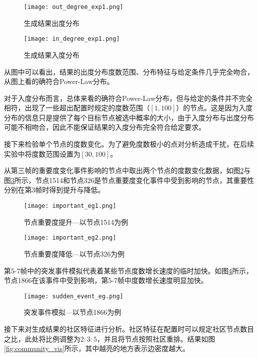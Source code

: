 \begin{figure}
\begin{minipage}{0.48\textwidth}
  \centering
  \texttt{[image: out\_degree\_exp1.png]}
  \caption{生成结果出度分布}
  \label{fig:parallel1}
\end{minipage}\hfill
\begin{minipage}{0.48\textwidth}
  \centering
  \texttt{[image: in\_degree\_exp1.png]}
  \caption{生成结果入度分布}
  \label{fig:parallel2}
\end{minipage}
\end{figure}

从图中可以看出，结果的出度分布度数范围、分布特征与给定条件几乎完全吻合，从图上看的确符合Power-Law分布。

对于入度分布而言，总体来看的确符合Power-Law分布，但与给定的条件并不完全相符，出现了一些超出配置时规定的度数范围（$[1, 100]$）的节点。这是因为入度分布的信息只是提供了每个目标节点被选中概率的大小，由于入度分布与出度分布可能不相吻合，因此不能保证结果的入度分布完全符合给定要求。

接下来检验单个节点的度数变化。为了避免度数极小的点对分析造成干扰，在后续实验中将度数范围设置为$[30, 100]$。

从第三帧的重要度变化事件影响的节点中取出两个节点的度数变化数据，如图\ref{fig:important_eg1}与图\ref{fig:important_eg2}所示，节点1514和节点326是节点重要度变化事件中受到影响的节点，其重要性分别在第3帧时得到提升与降低。

\begin{figure}[H]
  \centering
  \texttt{[image: important\_eg1.png]}
  \caption{节点重要度提升—以节点1514为例}
  \label{fig:important_eg1}
\end{figure}

\begin{figure}[H]
  \centering
  \texttt{[image: important\_eg2.png]}
  \caption{节点重要度降低—以节点326为例}
  \label{fig:important_eg2}
\end{figure}

第5-7帧中的突发事件模拟代表着某些节点度数增长速度的临时加快。如图\ref{fig:sudden_event_eg}所示，节点1866在该事件中受到影响，第5-7帧中度数增长速度明显加快。

\begin{figure}[H]
  \centering
  \texttt{[image: sudden\_event\_eg.png]}
  \caption{突发事件模拟—以节点1866为例}
  \label{fig:sudden_event_eg}
\end{figure}

接下来对生成结果的社区特征进行分析。社区特征在配置时可以规定社区节点数目之比，此处将比例调整为$2:3:5$，并且将节点按照社区重排。结果如图\ref{fig:community_vis}所示，其中越亮的地方表示边密度越大。

